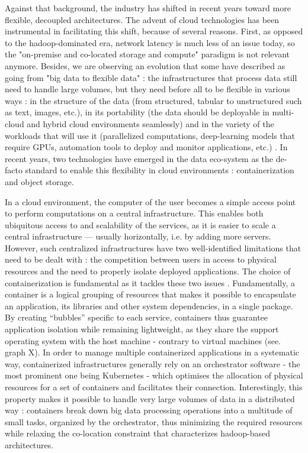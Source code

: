 Against that background, the industry has shifted in recent years toward more flexible, decoupled architectures. The advent of cloud technologies has been instrumental in facilitating this shift, because of several reasons. First, as opposed to the hadoop-dominated era, network latency is much less of an issue today, so the "on-premise and co-located storage and compute" paradigm is not relevant anymore. Besides, we are observing an evolution that some have described as going from "big data to flexible data" : the infrastructures that process data still need to handle large volumes, but they need before all to be flexible in various ways : in the structure of the data (from structured, tabular to unstructured such as text, images, etc.), in its portability (the data should be deployable in multi-cloud and hybrid cloud environments seamlessly) and in the variety of the workloads that will use it (parallelized computations, deep-learning models that require GPUs, automation tools to deploy and monitor applications, etc.) \cite{barua2021data}. In recent years, two technologies have emerged in the data eco-system as the de-facto standard to enable this flexibility in cloud environments : containerization and object storage. 

In a cloud environment, the computer of the user becomes a simple access point to perform computations on a central infrastructure. This enables both ubiquitous access to and scalability of the services, as it is easier to scale a central infrastructure — usually horizontally, i.e. by adding more servers. However, such centralized infrastructures have two well-identified limitations that need to be dealt with : the competition between users in access to physical resources and the need to properly isolate deployed applications. The choice of containerization is fundamental as it tackles these two issues \cite{bentaleb2022containerization}. Fundamentally, a container is a logical grouping of resources that makes it possible to encapsulate an application, its libraries and other system dependencies, in a single package. By creating “bubbles” specific to each service, containers thus guarantee application isolation while remaining lightweight, as they share the support operating system with the host machine - contrary to virtual machines (see. graph X). In order to manage multiple containerized applications in a systematic way, containerized infrastructures generally rely on an orchestrator software - the most prominent one being Kubernetes - which optimises the allocation of physical resources for a set of containers and facilitates their connection. Interestingly, this property makes it possible to handle very large volumes of data in a distributed way : containers break down big data processing operations into a multitude of small tasks, organized by the orchestrator, thus minimizing the required resources while relaxing the co-location constraint that characterizes hadoop-based architectures.

